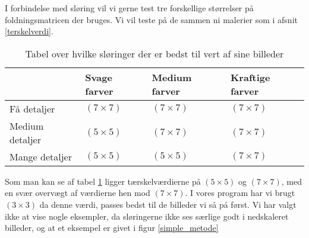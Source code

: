 I forbindelse med sløring vil vi gerne test tre forskellige størrelser på foldningsmatricen der bruges. Vi vil teste
på de sammen ni malerier som i afsnit \ref{terskelverdi}.

\begin{table}[!h]
    \centering
    \begin{tabular}{| l | l | l | l |} \hline
                            & Svage farver	& Medium farver	& Kraftige farver 	\\ \hline
        Få detaljer 		& $(7 \times 7)$	& $(7 \times 7)$	& $(7 \times 7)$		\\ \hline
        Medium detaljer 	& $(5 \times 5)$	& $(7 \times 7)$	& $(7 \times 7)$		\\ \hline
        Mange detaljer		& $(5 \times 5)$	& $(5 \times 5)$	& $(7 \times 7)$		\\ \hline
    \end{tabular}
    \caption{Tabel over hvilke sløringer der er bedst til vert af sine billeder}
    \label{sloringTabel}
\end{table}

Som man kan se af tabel \ref{sloringTabel} ligger tærskelværdierne på
$(5 \times 5)$ og $(7 \times 7)$, med en svær overvægt af værdierne hen
mod $(7 \times 7)$. I vores program har vi brugt $(3 \times 3)$ da denne
værdi, passes bedst til de billeder vi så på først. Vi har valgt ikke at
vise nogle eksempler, da sløringerne ikke ses særlige godt i nedskaleret
billeder, og at et eksempel er givet i figur \ref{simple_metode}
